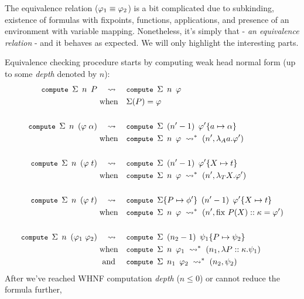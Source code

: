 \documentclass[english, mgr]{iithesis}
\renewcommand{\tt}[1]{\texttt{\small{#1}}}
\renewcommand{\it}[1]{\textit{#1}}
\begin{document}
The equivalence relation ($\varphi_1 \equiv \varphi_2$) is a bit complicated
due to subkinding, existence of formulas
with fixpoints, functions, applications,
and presence of an environment with variable mapping.
Nonetheless, it's simply that - \it{an equivalence relation} - and it
behaves as expected. We will only highlight the interesting parts.

Equivalence checking procedure starts by computing weak head normal form (up to some \it{depth} denoted by $n$):
\begin{align*}
\tt{compute }\Sigma\tt{ }n\tt{ }P
& \quad\leadsto\quad
\tt{compute }\Sigma\tt{ }n\tt{ }\formphi
\\
&\;\text{when} \quad \Sigma(P) = \formphi
\\ & \\
\tt{compute }\Sigma\tt{ }n\tt{ }{(\formphi \fAppAtom \atomexp )}
& \quad\leadsto\quad
\tt{compute }\Sigma\tt{ }(n' - 1)\tt{ }{\formphi'\subst{\atomv}{\atomexp}} \\
&\;\text{when} \quad \tt{compute }\Sigma\tt{ }n\tt{ }{\formphi} \;\leadsto^{*}\; (n',\fLamAtom{\atomv}\formphi')
\\ & \\
\tt{compute }\Sigma\tt{ }n\tt{ }{(\formphi \fAppTerm \term )}
& \quad\leadsto\quad
\tt{compute }\Sigma\tt{ }(n' - 1)\tt{ }{\formphi'\subst{\termv}{\term}} \\
&\;\text{when} \quad \tt{compute }\Sigma\tt{ }n\tt{ }{\formphi} \;\leadsto^{*}\; (n',\fLamTerm{\termv}\formphi')
\\ & \\
\tt{compute }\Sigma\tt{ }n\tt{ }{(\formphi \fAppTerm \term )}
& \quad\leadsto\quad
\tt{compute }\Sigma\subst{P}{\phi'}\tt{ }(n' - 1)\tt{ }{\formphi'\subst{\termv}{\term}}\\
&\;\text{when} \quad \tt{compute }\Sigma\tt{ }n\tt{ }{\formphi} \;\leadsto^{*}\; (n',\fix{P}{\termv}{\kind}\formphi')
\\ & \\
\tt{compute }\Sigma\tt{ }n\tt{ }{(\formphi_1 \fApp \formphi_2 )}
& \quad\leadsto\quad
\tt{compute }\Sigma\tt{ }(n_2 - 1)\tt{ }{\psi_1\subst{\propv}{\psi_2}}\\
&\;\text{when} \quad \tt{compute }\Sigma\tt{ }n\tt{ }{\formphi_1} \;\leadsto^{*}\; (n_1, \fLamForm{\propv}{\kind}{\psi_1})\\
&\;\text{ and } \quad \tt{compute }\Sigma\tt{ }n_1\tt{ }{\formphi_2} \;\leadsto^{*}\; (n_2, \psi_2)
\end{align*}
After we've reached WHNF computation \it{depth} ($ n \leqslant 0$) or cannot reduce the formula further,
\end{document}
